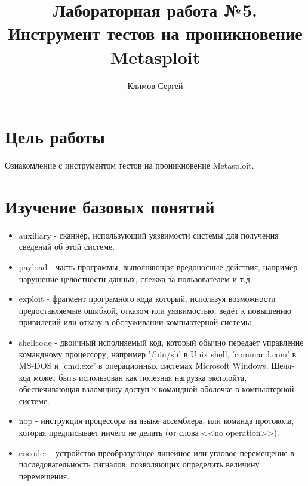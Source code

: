 \documentclass[10pt,a4paper]{report}
\author{Климов Сергей}
\title{Лабораторная работа №5.\\
	Инструмент тестов на проникновение Metasploit}
\begin{document}
	\maketitle
	\renewcommand{\thesection}{\arabic{section}}
	\tableofcontents
	\pagebreak
	
	\setcounter{totalnumber}{10}
	\setcounter{topnumber}{10}
	\setcounter{bottomnumber}{10}
	\renewcommand{\topfraction}{1}
	\renewcommand{\textfraction}{0}
	
	\section{Цель работы}
		Ознакомление с инструментом тестов на проникновение Metasploit.
	\section{Изучение базовых понятий}
		\begin{itemize}
			\item auxiliary - сканнер, использующий уязвимости системы для получения 
			сведений об этой системе.%
			\item payload - часть программы, выполняющая вредоносные действия, 
			например нарушение целостности данных, слежка за пользователем и т.д.%
			\item exploit - фрагмент програмного кода который, используя
			возможности предоставляемые ошибкой, отказом или уязвимостью, ведёт к
			повышению привилегий или отказу в обслуживании компьютерной системы.
			\item shellcode - двоичный исполняемый код, который обычно передаёт 
			управление командному процессору, например '/bin/sh' в Unix shell, 
			'command.com' в MS-DOS и 'cmd.exe' в операционных системах Microsoft 
			Windows. Шелл-код может быть использован как полезная нагрузка эксплойта, 
			обеспечивающая взломщику доступ к командной оболочке в компьютерной 
			системе.
			\item nop - инструкция процессора на языке ассемблера, или команда 
			протокола, которая предписывает ничего не делать (от слова <<no 
			operation>>).
			\item encoder - устройство преобразующее линейное или угловое перемещение 
			в последовательность сигналов, позволяющих определить величину 
			перемещения. 
		\end{itemize}
		
\end{document}
